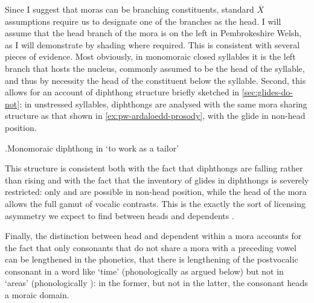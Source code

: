 Since I suggest that moras can be branching constituents, standard $\overline{X}$ assumptions require us to designate one of the branches as the head. I will assume that the head branch of the mora is on the left in Pembrokeshire Welsh, as I will demonstrate by shading where required. This is consistent with several pieces of evidence. Most obviously, in monomoraic closed syllables it is the left branch that hosts the nucleus, commonly assumed to be the head of the syllable, and thus by necessity the head of the constituent below the syllable. Second, this allows for an account of diphthong structure briefly sketched in \cref{sec:glides-do-not}: in unstressed syllables, diphthongs are analysed with the same mora sharing structure as that shown in \ref{ex:pw-ardaloedd-prosody}, with the glide in non\hyp head position.

\ex.\label{ex:teilwria-prosody}Monomoraic diphthong in \ipa{[teiˈlurja]} `to work as a tailor'\\

This structure is consistent both with the fact that diphthongs are falling rather than rising and with the fact that the inventory of glides in diphthongs is severely restricted: only \ipa{[i]} and \ipa{[u]} are possible in non\hyp head position, while the head of the mora allows the full gamut of vocalic contrasts. This is the exactly the sort of licensing asymmetry we expect to find between heads and dependents \citep[\cf especially][]{weijer96:_segmen}.

Finally, the distinction between head and dependent within a mora accounts for the fact that only consonants that do not share a mora with a preceding vowel can be lengthened in the phonetics, \ie that there is lengthening of the postvocalic consonant in a word like  `time' (phonologically  as argued below) but not in  `areas' (phonologically ): in the former, but not in the latter, the consonant heads a moraic domain.

